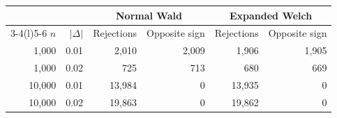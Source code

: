 \begin{tabular}{@{}rrrrrr@{}}
\toprule
& & \multicolumn{2}{c}{Normal Wald} & \multicolumn{2}{c}{Expanded Welch}\\
\cmidrule(lr){3-4}\cmidrule(l){5-6}
\(n\) & \(|\Delta|\) & Rejections & Opposite sign & Rejections & Opposite sign\\
\midrule
1,000 & 0.01 & 2,010 & 2,009 & 1,906 & 1,905\\
1,000 & 0.02 & 725 & 713 & 680 & 669\\
10,000 & 0.01 & 13,984 & 0 & 13,935 & 0\\
10,000 & 0.02 & 19,863 & 0 & 19,862 & 0\\
\bottomrule
\end{tabular}
